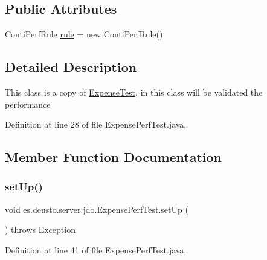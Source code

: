 \subsection*{Public Attributes}
\begin{DoxyCompactItemize}
\item 
Conti\+Perf\+Rule \hyperlink{classes_1_1deusto_1_1server_1_1jdo_1_1_expense_perf_test_a4bc33c2146c52fde7cbf361301444ecc}{rule} = new Conti\+Perf\+Rule()
\end{DoxyCompactItemize}


\subsection{Detailed Description}
This class is a copy of \hyperlink{classes_1_1deusto_1_1server_1_1jdo_1_1_expense_test}{Expense\+Test}, in this class will be validated the performance 

Definition at line 28 of file Expense\+Perf\+Test.\+java.



\subsection{Member Function Documentation}
\mbox{\label{classes_1_1deusto_1_1server_1_1jdo_1_1_expense_perf_test_a0e502f9886deb99f4b0ba6b31a546996}} 
\subsubsection{\texorpdfstring{set\+Up()}{setUp()}}
{\footnotesize\ttfamily void es.\+deusto.\+server.\+jdo.\+Expense\+Perf\+Test.\+set\+Up (\begin{DoxyParamCaption}{ }\end{DoxyParamCaption}) throws Exception}



Definition at line 41 of file Expense\+Perf\+Test.\+java.

\mbox{\label{classes_1_1deusto_1_1server_1_1jdo_1_1_expense_perf_test_ae31bef49b4d03ba25a303945ffadedad}} 
